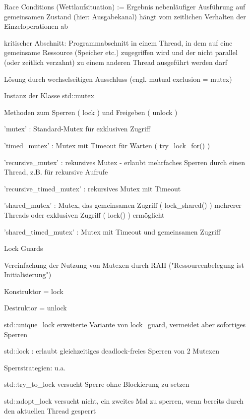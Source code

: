 \documentclass[10pt]{article}
\begin{document}
\begin{itemize*}
  \item Race Conditions (Wettlaufsituation) := Ergebnis nebenläufiger Ausführung auf gemeinsamen Zustand (hier: Ausgabekanal) hängt vom zeitlichen Verhalten der Einzeloperationen ab
  \item kritischer Abschnitt: Programmabschnitt in einem Thread, in dem auf eine gemeinsame Ressource (Speicher etc.) zugegriffen wird und der nicht parallel (oder zeitlich verzahnt) zu einem anderen Thread ausgeführt werden darf
  \item Lösung durch wechselseitigen Ausschluss (engl. mutual exclusion = mutex)
  \begin{itemize*}
    \item Instanz der Klasse std::mutex
    \item Methoden zum Sperren ( lock ) und Freigeben ( unlock )
    \item 'mutex' : Standard-Mutex für exklusiven Zugriff
    \item 'timed\_mutex' : Mutex mit Timeout für Warten ( try\_lock\_for() )
    \item 'recursive\_mutex' : rekursives Mutex - erlaubt mehrfaches Sperren durch einen Thread, z.B. für rekursive Aufrufe
    \item 'recursive\_timed\_mutex' : rekursives Mutex mit Timeout
    \item 'shared\_mutex' : Mutex, das gemeinsamen Zugriff ( lock\_shared() ) mehrerer Threads oder exklusiven Zugriff ( lock() ) ermöglicht
    \item 'shared\_timed\_mutex' : Mutex mit Timeout und gemeinsamen Zugriff
  \end{itemize*}
  \item Lock Guards
  \begin{itemize*}
    \item Vereinfachung der Nutzung von Mutexen durch RAII ("Ressourcenbelegung ist Initialisierung")
    \item Konstruktor = lock
    \item Destruktor = unlock
    \item std::unique\_lock erweiterte Variante von lock\_guard, vermeidet aber sofortiges Sperren
    \item std::lock : erlaubt gleichzeitiges deadlock-freies Sperren von 2 Mutexen
    \item Sperrstrategien: u.a.
    \begin{itemize*}
      \item std::try\_to\_lock versucht Sperre ohne Blockierung zu setzen
      \item std::adopt\_lock versucht nicht, ein zweites Mal zu sperren, wenn bereits durch den aktuellen Thread gesperrt
    \end{itemize*}
  \end{itemize*}
\end{itemize*}
\end{document}
